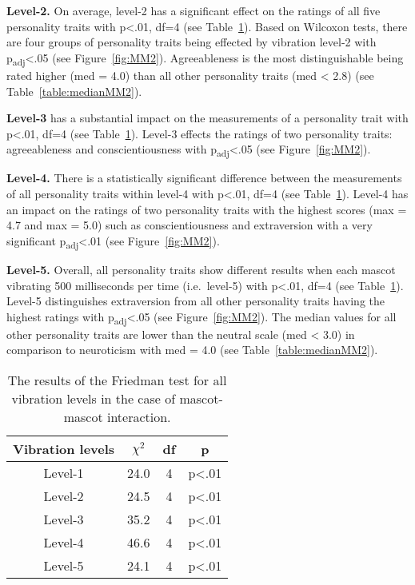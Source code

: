 \par\textbf{Level-2.}
On average, level-2 has a significant effect on the ratings of all five personality
traits with p<.01, df=4 (see Table~\ref{table:friedmanMM2}).
Based on Wilcoxon tests, there are four groups of personality traits being effected by
vibration level-2 with p\textsubscript{adj}<.05 (see Figure~\ref{fig:MM2}).
Agreeableness is the most distinguishable being rated higher (med = 4.0)
than all other personality traits (med < 2.8) (see Table~\ref{table:medianMM2}).

\par\textbf{Level-3}
has a substantial impact on the measurements of a personality trait
with p<.01, df=4 (see Table~\ref{table:friedmanMM2}).
Level-3 effects the ratings of two personality traits: agreeableness and
conscientiousness with p\textsubscript{adj}<.05 (see Figure~\ref{fig:MM2}).

\par\textbf{Level-4.}
There is a statistically significant difference between the measurements of all personality traits
within level-4 with p<.01, df=4 (see Table~\ref{table:friedmanMM2}).
Level-4 has an impact on the ratings of two personality traits with the highest scores (max = 4.7 and max = 5.0)
such as conscientiousness and extraversion
with a very significant p\textsubscript{adj}<.01 (see Figure~\ref{fig:MM2}).

\par\textbf{Level-5.}
Overall, all personality traits show different results when each mascot vibrating 500 milliseconds
per time (i.e.\ level-5) with p<.01, df=4 (see Table~\ref{table:friedmanMM2}).
Level-5 distinguishes extraversion from all other personality traits having the
highest ratings with p\textsubscript{adj}<.05 (see Figure~\ref{fig:MM2}).
The median values for all other personality traits are lower than the neutral scale (med < 3.0)
in comparison to neuroticism with med = 4.0 (see Table~\ref{table:medianMM2}).

\begin{table}[hbt!]
    \renewcommand{\arraystretch}{1}
    \begin{center}
        \begin{tabular}{|c|c|c|c|}
            \hline
            \textbf{Vibration levels} & \textbf{$\chi^2$} & \textbf{df} & \textbf{p} \\
            \hline
            Level-1 &24.0 &4 &p<.01 \\
            \hline
            Level-2 &24.5 &4 &p<.01 \\
            \hline
            Level-3 &35.2 &4 &p<.01 \\
            \hline
            Level-4 &46.6 &4 &p<.01 \\
            \hline
            Level-5 &24.1 &4 &p<.01 \\
            \hline
        \end{tabular}
        \caption{The results of the Friedman test for all vibration levels in the case of mascot-mascot interaction.}
        \label{table:friedmanMM2}
    \end{center}
\end{table}

